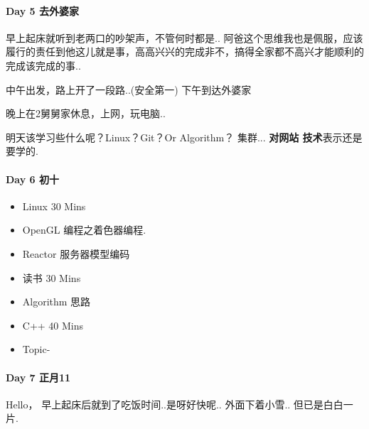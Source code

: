 \documentclass[UTF8,a4paper,8pt]{ctexart}
\begin{document}
 	 \paragraph{Day 5   去外婆家    \quad     }
	 	 早上起床就听到老两口的吵架声，不管何时都是.. 阿爸这个思维我也是佩服，应该履行的责任到他这儿就是事，高高兴兴的完成非不，搞得全家都不高兴才能顺利的完成该完成的事..
	 	 
	 	 中午出发，路上开了一段路..(安全第一) 下午到达外婆家
	 	 
	 	 晚上在2舅舅家休息，上网，玩电脑..
	 	 
	 	 明天该学习些什么呢？Linux？Git？Or Algorithm？ 集群... \textbf{对网站 技术}表示还是要学的.
	 	 
 	 \paragraph{Day 6   初十    \quad     }
	 	 \begin{itemize}
	 	 	\item  \makebox[0pt][l]{$\square$}\raisebox{.15ex}{\hspace{0.1em}$\checkmark$} Linux 30 Mins
	 	 	\item  \makebox[0pt][l]{$\square$}\raisebox{.15ex}{\hspace{0.1em}$\checkmark$} OpenGL 编程之着色器编程.
	 	 	\item  \makebox[0pt][l]{$\square$}\raisebox{.15ex}{\hspace{0.1em}$\checkmark$} Reactor 服务器模型编码
	 	 	
	 	 	\item  \makebox[0pt][l]{$\square$}\raisebox{.15ex}{\hspace{0.1em}$\checkmark$} 读书  30 Mins		 	 
	 	 	\item  \makebox[0pt][l]{$\square$}\raisebox{.15ex}{\hspace{0.1em}$\checkmark$} Algorithm 思路
	 	 	\item  \makebox[0pt][l]{$\square$}\raisebox{.15ex}{\hspace{0.1em}$\checkmark$} C++  40 Mins
	 	 	
	 	 	\item  \makebox[0pt][l]{$\square$}\raisebox{.15ex}{\hspace{0.1em}$\checkmark$} Topic- 
	 	 \end{itemize}
 	 \paragraph{Day 7   正月11    \quad     }
	 	 Hello， 早上起床后就到了吃饭时间..是呀好快呢.. 外面下着小雪.. 但已是白白一片.
	 	 
\end{document}
